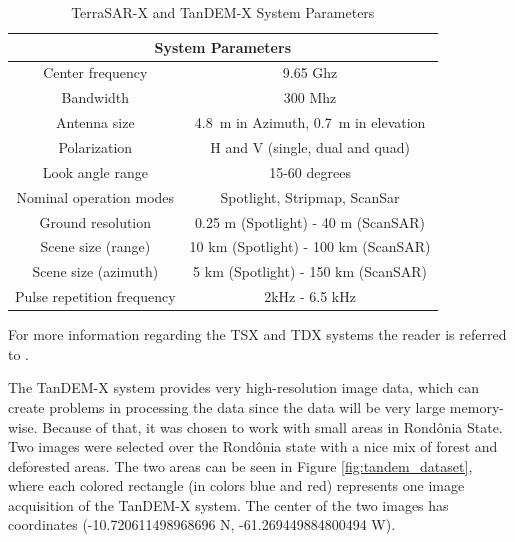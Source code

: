 \begin{table}[H]
    \centering
    \begin{tabular}{|c|c|}
        \hline 
        \multicolumn{2}{|c|}{System Parameters} \\ 
        \hline \hline
        Center frequency & 9.65 Ghz  \\ \hline
        Bandwidth & 300 Mhz  \\ \hline
        Antenna size & 4.8 m in Azimuth, 0.7 m in elevation  \\ \hline
        Polarization & H and V (single, dual and quad)  \\ \hline
        Look angle range & 15-60 degrees  \\ \hline
        Nominal operation modes & Spotlight, Stripmap, ScanSar  \\ \hline
        Ground resolution & 0.25 m (Spotlight) - 40 m (ScanSAR) \\ \hline
        Scene size (range) & 10 km (Spotlight) - 100 km (ScanSAR)  \\ \hline
        Scene size (azimuth) & 5 km (Spotlight) - 150 km (ScanSAR)  \\ \hline
        Pulse repetition frequency & 2kHz - 6.5 kHz \\ \hline
    \end{tabular}
    \caption{TerraSAR-X and TanDEM-X System Parameters}
    \label{tab:tandem_params}
\end{table}

For more information regarding the TSX and TDX systems the reader is referred to \cite{Alberto}.

The TanDEM-X system provides very high-resolution image data, which can create problems in processing the data since the data will be very large memory-wise. Because of that, it was chosen to work with small areas in Rondônia State. Two images were selected over the Rondônia state with a nice mix of forest and deforested areas. The two areas can be seen in Figure \ref{fig:tandem_dataset}, where each colored rectangle (in colors blue and red) represents one image acquisition of the TanDEM-X system. The center of the two images has coordinates (-10.720611498968696 N, -61.269449884800494 W).

